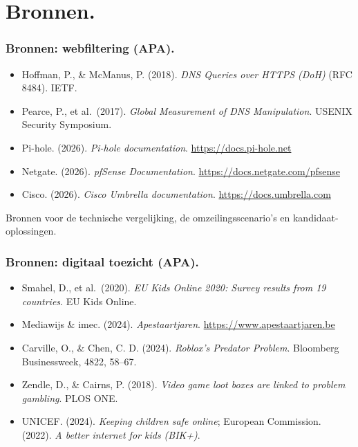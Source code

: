 \documentclass[aspectratio=169]{beamer}
\begin{document}
\section{Bronnen.}

\begin{frame}
    \frametitle{Bronnen: webfiltering (APA).}

    \small
    \begin{itemize}
        \item Hoffman, P., \& McManus, P. (2018). \textit{DNS Queries
              over HTTPS (DoH)} (RFC 8484). IETF.
        \item Pearce, P., et al.\ (2017). \textit{Global Measurement of
              DNS Manipulation}. USENIX Security Symposium.
        \item Pi-hole. (2026). \textit{Pi-hole documentation}.
              \url{https://docs.pi-hole.net}
        \item Netgate. (2026). \textit{pfSense Documentation}.
              \url{https://docs.netgate.com/pfsense}
        \item Cisco. (2026). \textit{Cisco Umbrella documentation}.
              \url{https://docs.umbrella.com}
    \end{itemize}

    \medskip
    \textcolor{hggrey}{\footnotesize Bronnen voor de technische
    vergelijking, de omzeilingsscenario's en kandidaat-oplossingen.}
\end{frame}

\begin{frame}
    \frametitle{Bronnen: digitaal toezicht (APA).}

    \small
    \begin{itemize}
        \item Smahel, D., et al.\ (2020). \textit{EU Kids Online 2020:
              Survey results from 19 countries}. EU Kids Online.
        \item Mediawijs \& imec. (2024). \textit{Apestaartjaren}.
              \url{https://www.apestaartjaren.be}
        \item Carville, O., \& Chen, C. D. (2024). \textit{Roblox's
              Predator Problem}. Bloomberg Businessweek, 4822, 58--67.
        \item Zendle, D., \& Cairns, P. (2018). \textit{Video game loot
              boxes are linked to problem gambling}. PLOS ONE.
        \item UNICEF. (2024). \textit{Keeping children safe online};
              European Commission. (2022). \textit{A better internet for
              kids (BIK+)}.
    \end{itemize}
\end{frame}
\end{document}
